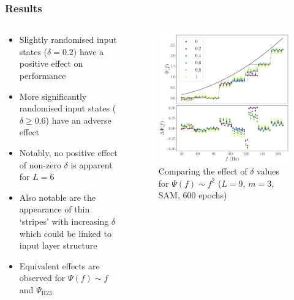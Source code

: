 \documentclass{beamer}
\begin{document}
\begin{frame}
\frametitle{Results}
\begin{columns}
\begin{column}{0.5\textwidth}
\begin{itemize}
\item Slightly randomised input states ($\delta = 0.2$)  have a \alert{positive effect} on performance
\item More significantly randomised input states ($\delta \geq 0.6$) have an \alert{adverse effect}
\item Notably, no positive effect of non-zero $\delta$ is apparent for $L=6$  
\item Also notable are the appearance of thin \alert{`stripes'} with increasing $\delta$ which could be linked to input layer structure
\item Equivalent effects are observed for $\Psi(f) \sim f $ and $\Psi_\text{H23}$
\end{itemize}
\end{column}
\begin{column}{0.5\textwidth}
\begin{figure}
\centering 
\includegraphics[width=\textwidth]{im/psi_comp_delta_L9}
\caption{Comparing the effect of $\delta$ values for $\Psi(f) \sim f^2$ ($L=9$, $m=3$, SAM, 600 epochs)}
\end{figure}
\end{column}
\end{columns}


\end{frame}
\end{document}
